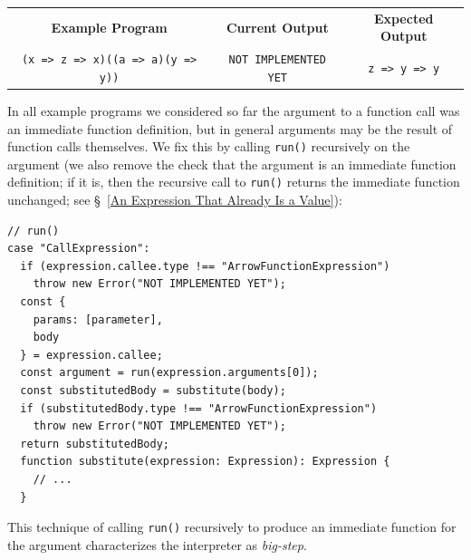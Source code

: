 \documentclass[12pt, oneside]{book}
\begin{document}
\begin{center}
\begin{tabular}{c|c|c}
\textbf{Example Program} & \textbf{Current Output} & \textbf{Expected Output} \\
\texttt{(x => z => x)((a => a)(y => y))} & \texttt{NOT IMPLEMENTED YET} & \texttt{z => y => y} \\
\end{tabular}
\end{center}

In all example programs we considered so far the argument to a function call was an immediate function definition, but in general arguments may be the result of function calls themselves. We fix this by calling \texttt{run()} recursively on the argument (we also remove the check that the argument is an immediate function definition; if it is, then the recursive call to \texttt{run()} returns the immediate function unchanged; see §~\ref{An Expression That Already Is a Value}):

\begin{verbatim}
// run()
case "CallExpression":
  if (expression.callee.type !== "ArrowFunctionExpression")
    throw new Error("NOT IMPLEMENTED YET");
  const {
    params: [parameter],
    body
  } = expression.callee;
  const argument = run(expression.arguments[0]);
  const substitutedBody = substitute(body);
  if (substitutedBody.type !== "ArrowFunctionExpression")
    throw new Error("NOT IMPLEMENTED YET");
  return substitutedBody;
  function substitute(expression: Expression): Expression {
    // ...
  }
\end{verbatim}

\begin{mdframed}[frametitle = {Technical Terms}]
This technique of calling \texttt{run()} recursively to produce an immediate function for the argument characterizes the interpreter as \emph{big-step}.
\end{mdframed}
\end{document}
